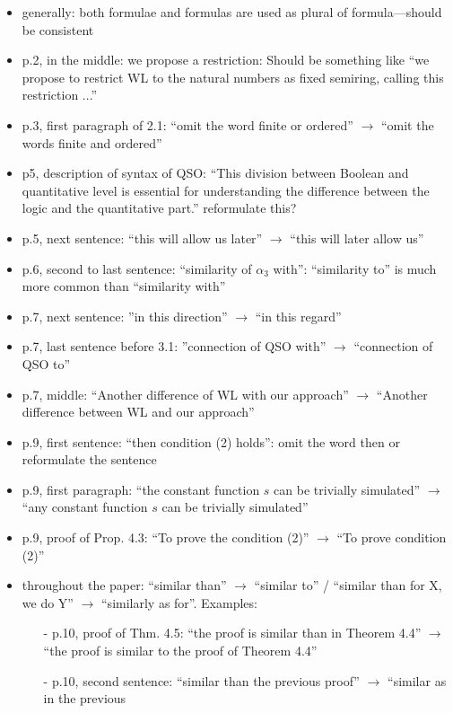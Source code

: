\begin{itemize}
	\setlength\itemsep{0.5em}
	\item generally: both formulae and formulas are used as plural of formula---should be consistent
	\item p.2, in the middle: we propose a restriction: Should be something like ``we propose to restrict
	WL to the natural numbers as fixed semiring, calling this restriction ...''
	\item p.3, first paragraph of 2.1: ``omit the word finite or ordered'' $\to$ ``omit the words finite and
	ordered''
	\item p5, description of syntax of QSO: ``This division between Boolean and quantitative level
	is essential for understanding the difference between the logic and the quantitative part.''
	reformulate this?
	\item p.5, next sentence: ``this will allow us later'' $\to$ ``this will later allow us''
	\item p.6, second to last sentence: ``similarity of $\alpha_3$ with'': ``similarity to'' is much more common
	than ``similarity with''
	\item p.7, next sentence: ''in this direction'' $\to$ ``in this regard''
	\item p.7, last sentence before 3.1: ''connection of QSO with'' $\to$ ``connection of QSO to''
	\item p.7, middle: ``Another difference of WL with our approach'' $\to$ ``Another difference between
	WL and our approach''
	\item p.9, first sentence: ``then condition (2) holds'': omit the word then or reformulate the sentence
	\item p.9, first paragraph: ``the constant function $s$ can be trivially simulated'' $\to$ ``any constant
	function $s$ can be trivially simulated''
	\item p.9, proof of Prop. 4.3: ``To prove the condition (2)'' $\to$ ``To prove condition (2)''
	\item throughout the paper: ``similar than'' $\to$ ``similar to'' / ``similar than for X, we do Y'' $\to$
	``similarly as for''. Examples:
	\begin{itemize}
	\item[-] p.10, proof of Thm. 4.5: ``the proof is similar than in Theorem 4.4'' $\to$ ``the proof is
	similar to the proof of Theorem 4.4''	
	\item[-] p.10, second sentence: ``similar than the previous proof'' $\to$ ``similar as in the previous

\end{itemize}
\end{itemize}
